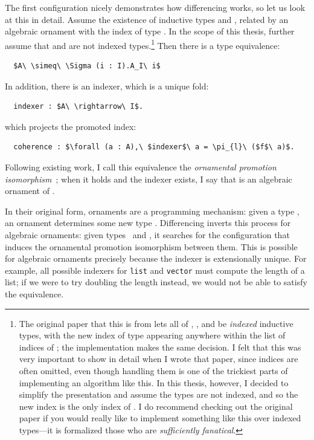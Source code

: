 The first configuration nicely demonstrates how differencing works, so let us look at this in detail.
Assume the existence of inductive types \Aa and \AI, related by an algebraic ornament with the index of type \I.
In the scope of this thesis, further assume that \Aa and \I are not indexed types.\footnote{The original paper that this is from lets all of \Aa,
\AI, and \I be \textit{indexed} inductive types, with the new index of type \I appearing anywhere within the list of indices of \AI;
the implementation makes the same decision.
I felt that this was very important to show in detail when I wrote that paper, since indices are often omitted,
even though handling them is one of the trickiest parts of implementing an algorithm like this.
In this thesis, however, I decided to simplify the presentation and assume the types are not indexed,
and so the new index is the only index of \AI.
I do recommend checking out the original paper if you would really like to implement something like this over indexed types---it is formalized
those who are \textit{sufficiently fanatical}.}
Then there is a type equivalence:

\begin{lstlisting}
  $A\ \simeq\ \Sigma (i : I).A_I\ i$
\end{lstlisting}
In addition, there is an indexer, which is a unique fold:

\begin{lstlisting}
  indexer : $A\ \rightarrow\ I$.
\end{lstlisting}
which projects the promoted index:
\begin{lstlisting}
  coherence : $\forall (a : A),\ $indexer$\ a = \pi_{l}\ ($f$\ a)$.
\end{lstlisting}
Following existing work, I call this equivalence the \textit{ornamental promotion isomorphism}~\cite{ko2016programming}; 
when it holds and the indexer exists, I say that \AI is an algebraic ornament of \Aa.

In their original form, ornaments are a programming mechanism: given a type \Aa, an ornament determines
some new type \AI. Differencing inverts this process for algebraic ornaments: given types \Aa\ and \AI, 
it searches for the configuration that induces the ornamental promotion isomorphism between them.
This is possible for algebraic ornaments precisely because the indexer is extensionally unique.
For example, all possible indexers for \lstinline{list} and \lstinline{vector} must compute
the length of a list; if we were to try doubling the length instead, we would not be able to satisfy the equivalence.

